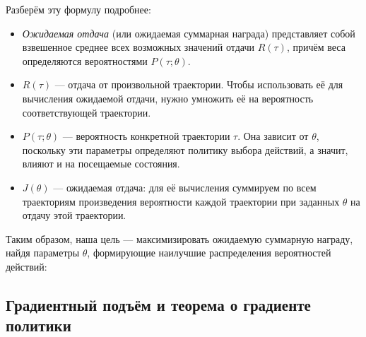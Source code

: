 \documentclass[11pt,a4paper]{article}
\begin{document}
Разберём эту формулу подробнее:

\begin{itemize}
\tightlist
\item
  \emph{Ожидаемая отдача} (или ожидаемая суммарная награда) представляет собой взвешенное среднее всех возможных значений отдачи \(R(\tau)\), причём веса определяются вероятностями \(P(\tau;\theta)\).
\end{itemize}


\begin{itemize}
\item
  \(R(\tau)\) --- отдача от произвольной траектории. Чтобы использовать её для вычисления ожидаемой отдачи, нужно умножить её на вероятность соответствующей траектории.
\item
  \(P(\tau;\theta)\) --- вероятность конкретной траектории \(\tau\). Она зависит от \(\theta\), поскольку эти параметры определяют политику выбора действий, а значит, влияют и на посещаемые состояния.
\end{itemize}


\begin{itemize}
\tightlist
\item
  \(J(\theta)\) --- ожидаемая отдача: для её вычисления суммируем по всем траекториям произведения вероятности каждой траектории при заданных \(\theta\) на отдачу этой траектории.
\end{itemize}

Таким образом, наша цель --- максимизировать ожидаемую суммарную награду, найдя параметры \(\theta\), формирующие наилучшие распределения вероятностей действий:


\subsection{Градиентный подъём и теорема о градиенте политики}\label{gradient-ascent-and-the-policy-gradient-theorem}
\end{document}
